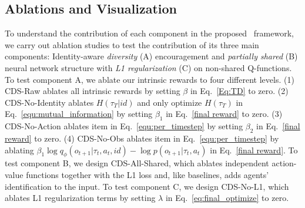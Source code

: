



\subsection{Ablations and Visualization}
\label{exp:ab}


To understand the contribution of each component in the proposed \name~framework, we carry out ablation studies to test the contribution of its three main components: Identity-aware \emph{diversity} (A) encouragement and \emph{partially shared} (B) neural network structure with \emph{L1 regularization} (C) on non-shared Q-functions. To test component A, we ablate our intrinsic rewards to four different levels. (1) CDS-Raw ablates all intrinsic rewards by setting $\beta$ in Eq.~\ref{Eq:TD} to zero. (2) CDS-No-Identity ablates $H\left(\tau_{T} | i d\right)$ and only optimize $H\left(\tau_{T} \right)$ in Eq.~\ref{equ:mutual_information} by setting $\beta_1$ in Eq.~\ref{final reward} to zero. (3) CDS-No-Action ablates item  in Eq.~\ref{equ:per_timestep} by setting $\beta_2$ in Eq.~\ref{final reward} to zero. (4) CDS-No-Obs ablates item  in Eq.~\ref{equ:per_timestep} by ablating $\beta_{1} \log q_{\phi}\left(o_{t+1} | \tau_{t}, a_{t}, i d\right)-\log p\left(o_{t+1} | \tau_{t}, a_{t}\right)$ in Eq.~\ref{final reward}. To test component B, we design CDS-All-Shared, which ablates independent action-value functions together with the L1 loss and, like baselines, adds agents' identification to the input. To test component C, we design CDS-No-L1, which ablates L1 regularization terms by setting $\lambda$ in Eq.~\ref{eq:final_optimize} to zero.

